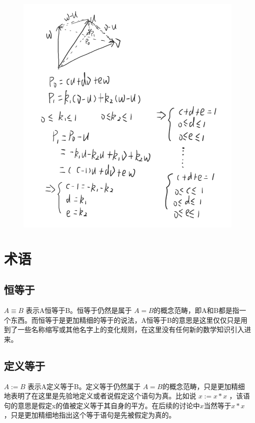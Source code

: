 \documentclass[12pt,oneside]{book}
\begin{document}
\begin{figure}[H]
\centering
\includegraphics[width=\linewidth ,totalheight=0.95\textheight , keepaspectratio]{线性代数引论问题集1_1_20.png}
\end{figure}


\chapter{术语}
\section{恒等于}
$A \equiv B$ 表示A恒等于B。恒等于仍然是属于 $A=B$的概念范畴，即A和B都是指一个东西。而恒等于是更加精细的等于的说法，A恒等于B的意思是这里仅仅只是用到了一些名称缩写或其他名字上的变化规则，在这里没有任何新的数学知识引入进来。

\section{定义等于}
$A := B$ 表示A定义等于B。定义等于仍然属于 $A=B$的概念范畴，只是更加精细地表明了在这里是先验地定义或者说假定这个语句为真。比如说 $x := x*x$ ，该语句的意思是假定x的值被定义等于其自身的平方。在后续的讨论中$x$当然等于$x*x$，只是更加精细地指出这个等于语句是先被假定为真的。
\end{document}
